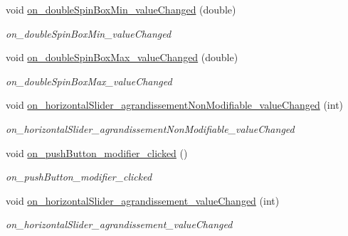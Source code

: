 \begin{DoxyCompactItemize}
void \hyperlink{classAppMainWindow_a788925d89b1ddd65bd925bbe5edd228d}{on\+\_\+double\+Spin\+Box\+Min\+\_\+value\+Changed} (double)
\begin{DoxyCompactList}\small\item\em on\+\_\+double\+Spin\+Box\+Min\+\_\+value\+Changed \end{DoxyCompactList}\item 
\mbox{\label{classAppMainWindow_a937503d2539b01093ee2c3479918bf7f}} 
void \hyperlink{classAppMainWindow_a937503d2539b01093ee2c3479918bf7f}{on\+\_\+double\+Spin\+Box\+Max\+\_\+value\+Changed} (double)
\begin{DoxyCompactList}\small\item\em on\+\_\+double\+Spin\+Box\+Max\+\_\+value\+Changed \end{DoxyCompactList}\item 
\mbox{\label{classAppMainWindow_a3465793b22d26803be33b64758933fb7}} 
void \hyperlink{classAppMainWindow_a3465793b22d26803be33b64758933fb7}{on\+\_\+horizontal\+Slider\+\_\+agrandissement\+Non\+Modifiable\+\_\+value\+Changed} (int)
\begin{DoxyCompactList}\small\item\em on\+\_\+horizontal\+Slider\+\_\+agrandissement\+Non\+Modifiable\+\_\+value\+Changed \end{DoxyCompactList}\item 
\mbox{\label{classAppMainWindow_ab8bab04abb5d76bfffbc5c6d468ee981}} 
void \hyperlink{classAppMainWindow_ab8bab04abb5d76bfffbc5c6d468ee981}{on\+\_\+push\+Button\+\_\+modifier\+\_\+clicked} ()
\begin{DoxyCompactList}\small\item\em on\+\_\+push\+Button\+\_\+modifier\+\_\+clicked \end{DoxyCompactList}\item 
\mbox{\label{classAppMainWindow_a49ba69820f7ed19e7dd245aa60479fee}} 
void \hyperlink{classAppMainWindow_a49ba69820f7ed19e7dd245aa60479fee}{on\+\_\+horizontal\+Slider\+\_\+agrandissement\+\_\+value\+Changed} (int)
\begin{DoxyCompactList}\small\item\em on\+\_\+horizontal\+Slider\+\_\+agrandissement\+\_\+value\+Changed \end{DoxyCompactList}\item 

\end{DoxyCompactItemize}
